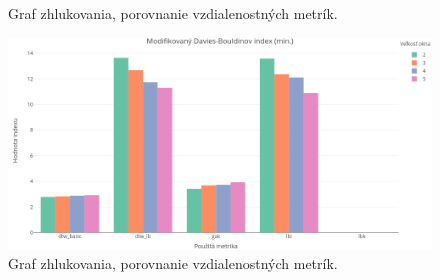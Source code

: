 \documentclass[a4paper,twoside,slovak,12pt,appendix]{article}
\begin{document}
\begin{appendices}
\begin{figure}[htbp]
  \caption{Graf zhlukovania, porovnanie vzdialenostných metrík.}
\end{figure}
\begin{figure}[htbp]
  \centering
  \includegraphics[width=\textwidth]{cvi/metric_comparison/201902271851-DBstar-metric_comparison.png}
  \caption{Graf zhlukovania, porovnanie vzdialenostných metrík.}
\end{figure}


\end{appendices}
\end{document}
